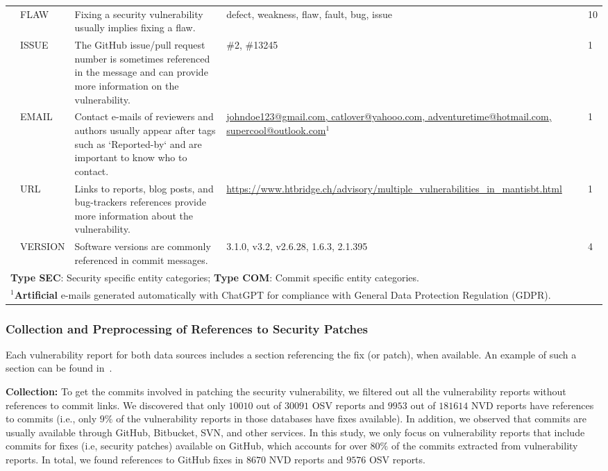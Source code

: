 \begin{table}[t!]
\begin{tabular}{ | p{0.5cm} | p{1.4cm} | p{8.5cm} | p{5.5cm} |  p{0.5cm} | }
        & FLAW & Fixing a security vulnerability usually implies fixing a flaw. & defect, weakness, flaw, fault, bug, issue & 10 \\\cline{2-5}
        
        & ISSUE & The GitHub issue/pull request number is sometimes referenced in the message and can provide more information on the vulnerability. & \#2, \#13245 & 1 \\\cline{2-5}
        
        & EMAIL & Contact e-mails of reviewers and authors usually appear after tags such as `Reported-by` and are important to know who to contact. & \url{johndoe123@gmail.com, catlover@yahooo.com, adventuretime@hotmail.com, supercool@outlook.com}$^1$  & 1\\\cline{2-5}
        
        & URL & Links to reports, blog posts, and bug-trackers references provide more information about the vulnerability. & \url{https://www.htbridge.ch/advisory/multiple_vulnerabilities_in_mantisbt.html} & 1\\\cline{2-5}
        
        & VERSION & Software versions are commonly referenced in commit messages. & 3.1.0, v3.2, v2.6.28, 1.6.3, 2.1.395 & 4\\\hline
        \multicolumn{5}{|l|}{\textbf{Type SEC}: Security specific entity categories; \textbf{Type COM}: Commit specific entity categories.} \\
        \multicolumn{5}{|l|}{$^1$\textbf{Artificial} e-mails generated automatically with ChatGPT for compliance with General Data Protection Regulation (GDPR).} \\\hline
    \end{tabular}
    \label{tab:entities-desc}
\end{table}

\subsubsection{Collection and Preprocessing of References to Security Patches}

Each vulnerability report for both data sources includes a section referencing the fix (or patch), when 
available. An example of such a section can be found in~\cite{cve-example}. 

\textbf{Collection:} To get the commits involved in patching the security vulnerability, we filtered out all the vulnerability reports without references to commit links. We discovered that only $10010$ out of $30091$ OSV reports and $9953$ out of $181614$ NVD reports have references to commits 
(i.e., only $9\%$ of the vulnerability reports in those databases have fixes available). In addition, we observed that commits 
are usually available through GitHub, Bitbucket, SVN, and other services.
In this study, we only focus on vulnerability reports that include commits for fixes (i.e, security patches) available on GitHub, which accounts for over $80\%$ of the commits extracted from vulnerability 
reports. In total, we found references to GitHub fixes in $8670$ NVD reports and $9576$ OSV reports.

